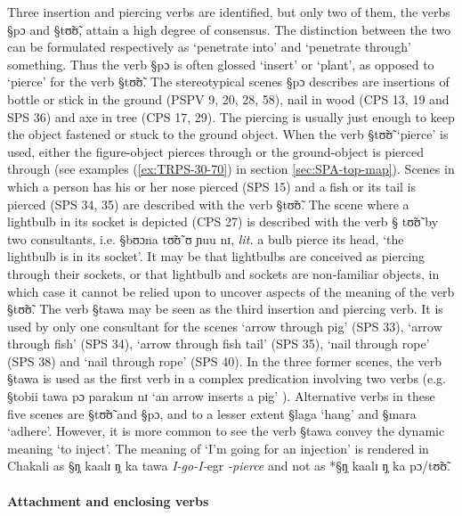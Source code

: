 Three insertion and piercing verbs are identified, but only two of them,   the
verbs {\S pɔ} and  {\S tʊ̃ʊ̃}, attain a  high degree of consensus.  The
distinction between the two can be formulated respectively as `penetrate into'
and `penetrate through' something. Thus the verb {\S pɔ} is often glossed
`insert' or `plant', as opposed to `pierce' for the verb {\S tʊ̃ʊ̃}. The
stereotypical scenes {\S pɔ} describes are insertions of bottle or stick in the
ground (PSPV 9, 20, 28, 58),  nail in wood (CPS 13, 19 and SPS 36) and  axe in
tree (CPS 17, 29). The piercing is usually just enough to keep the object
fastened
or stuck to the ground object.  When the verb {\S tʊ̃ʊ̃} `pierce' is used, 
either the
figure-object pierces through or the ground-object is pierced through (see
examples (\ref{ex:TRPS-30-70}) in section \ref{sec:SPA-top-map}). Scenes in
which a person has his or her nose pierced (SPS 15) and   a fish or its tail
is pierced (SPS 34, 35)  are described with the verb {\S tʊ̃ʊ̃}. The scene where
a lightbulb  in its socket is depicted (CPS 27) is described with the verb {\S
tʊ̃ʊ̃} by two consultants, i.e. {\S bʊɔna tʊ̃ʊ̃ ʊ ɲuu nɪ}, {\it lit.} a bulb
pierce its head,  `the lightbulb is in its socket'. It may be that lightbulbs
are
conceived as piercing
through their sockets, or that lightbulb and sockets are non-familiar objects,
in 
which case it cannot be relied upon to uncover aspects of the meaning of the
verb {\S tʊ̃ʊ̃}.
The  verb   {\S tawa} may be seen as the third insertion and piercing verb. It
is used by only one consultant for the scenes `arrow through pig' (SPS 33),
 `arrow through fish' (SPS 34), `arrow through fish tail' (SPS 35), `nail
through rope' (SPS 38)  and  `nail
through rope' (SPS  40).  In the three former scenes, the verb {\S tawa}  is
used as the first verb
in a complex predication involving two verbs (e.g. {\S tobii tawa pɔ parakun
nɪ} `an arrow inserts a pig' ).  Alternative verbs in
these five scenes are {\S tʊ̃ʊ̃} and {\S pɔ}, and to a lesser extent {\S laga}
`hang'
and {\S mara} `adhere'. However, it is more common to see the verb   {\S tawa}
convey the
dynamic meaning `to inject'. The meaning of  `I'm going for an injection' is
rendered in Chakali as {\S ŋ̩ kaalɪ ŋ̩ ka tawa}  {\it I-go-I-}{\sc egr}{\it
-pierce} and not as *{\S ŋ̩ kaalɪ ŋ̩ ka
pɔ/tʊ̃ʊ̃}.

\paragraph{Attachment and  enclosing verbs}
\label{sec:SPA-cover-v}

